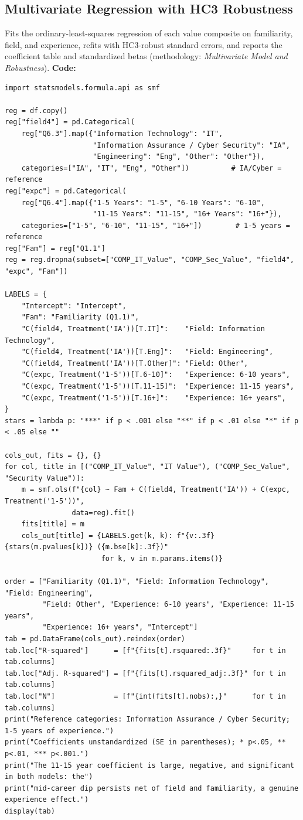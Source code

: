 \subsection{Multivariate Regression with HC3 Robustness}
Fits the ordinary-least-squares regression of each value composite on familiarity, field, and experience, refits with HC3-robust standard errors, and reports the coefficient table and standardized betas (methodology: \emph{Multivariate Model and Robustness}).
\noindent\textbf{Code:}\nopagebreak
{\scriptsize\begin{verbatim}
import statsmodels.formula.api as smf

reg = df.copy()
reg["field4"] = pd.Categorical(
    reg["Q6.3"].map({"Information Technology": "IT",
                     "Information Assurance / Cyber Security": "IA",
                     "Engineering": "Eng", "Other": "Other"}),
    categories=["IA", "IT", "Eng", "Other"])          # IA/Cyber = reference
reg["expc"] = pd.Categorical(
    reg["Q6.4"].map({"1-5 Years": "1-5", "6-10 Years": "6-10",
                     "11-15 Years": "11-15", "16+ Years": "16+"}),
    categories=["1-5", "6-10", "11-15", "16+"])        # 1-5 years = reference
reg["Fam"] = reg["Q1.1"]
reg = reg.dropna(subset=["COMP_IT_Value", "COMP_Sec_Value", "field4", "expc", "Fam"])

LABELS = {
    "Intercept": "Intercept",
    "Fam": "Familiarity (Q1.1)",
    "C(field4, Treatment('IA'))[T.IT]":    "Field: Information Technology",
    "C(field4, Treatment('IA'))[T.Eng]":   "Field: Engineering",
    "C(field4, Treatment('IA'))[T.Other]": "Field: Other",
    "C(expc, Treatment('1-5'))[T.6-10]":   "Experience: 6-10 years",
    "C(expc, Treatment('1-5'))[T.11-15]":  "Experience: 11-15 years",
    "C(expc, Treatment('1-5'))[T.16+]":    "Experience: 16+ years",
}
stars = lambda p: "***" if p < .001 else "**" if p < .01 else "*" if p < .05 else ""

cols_out, fits = {}, {}
for col, title in [("COMP_IT_Value", "IT Value"), ("COMP_Sec_Value", "Security Value")]:
    m = smf.ols(f"{col} ~ Fam + C(field4, Treatment('IA')) + C(expc, Treatment('1-5'))",
                data=reg).fit()
    fits[title] = m
    cols_out[title] = {LABELS.get(k, k): f"{v:.3f}{stars(m.pvalues[k])} ({m.bse[k]:.3f})"
                       for k, v in m.params.items()}

order = ["Familiarity (Q1.1)", "Field: Information Technology", "Field: Engineering",
         "Field: Other", "Experience: 6-10 years", "Experience: 11-15 years",
         "Experience: 16+ years", "Intercept"]
tab = pd.DataFrame(cols_out).reindex(order)
tab.loc["R-squared"]      = [f"{fits[t].rsquared:.3f}"     for t in tab.columns]
tab.loc["Adj. R-squared"] = [f"{fits[t].rsquared_adj:.3f}" for t in tab.columns]
tab.loc["N"]              = [f"{int(fits[t].nobs):,}"      for t in tab.columns]
print("Reference categories: Information Assurance / Cyber Security; 1-5 years of experience.")
print("Coefficients unstandardized (SE in parentheses); * p<.05, ** p<.01, *** p<.001.")
print("The 11-15 year coefficient is large, negative, and significant in both models: the")
print("mid-career dip persists net of field and familiarity, a genuine experience effect.")
display(tab)


\end{verbatim}}
